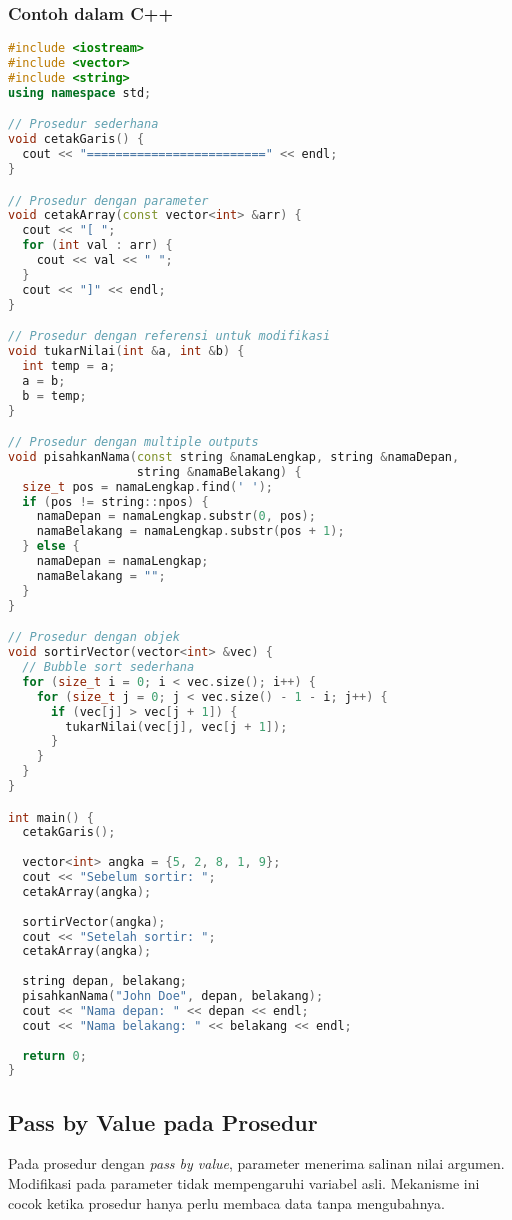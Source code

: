 \documentclass[../main.tex]{subfiles}
\begin{document}
\subsubsection{Contoh dalam C++}
\begin{lstlisting}[language=C++, caption={Definisi prosedur (C++)}]
#include <iostream>
#include <vector>
#include <string>
using namespace std;

// Prosedur sederhana
void cetakGaris() {
  cout << "=========================" << endl;
}

// Prosedur dengan parameter
void cetakArray(const vector<int> &arr) {
  cout << "[ ";
  for (int val : arr) {
    cout << val << " ";
  }
  cout << "]" << endl;
}

// Prosedur dengan referensi untuk modifikasi
void tukarNilai(int &a, int &b) {
  int temp = a;
  a = b;
  b = temp;
}

// Prosedur dengan multiple outputs
void pisahkanNama(const string &namaLengkap, string &namaDepan, 
                  string &namaBelakang) {
  size_t pos = namaLengkap.find(' ');
  if (pos != string::npos) {
    namaDepan = namaLengkap.substr(0, pos);
    namaBelakang = namaLengkap.substr(pos + 1);
  } else {
    namaDepan = namaLengkap;
    namaBelakang = "";
  }
}

// Prosedur dengan objek
void sortirVector(vector<int> &vec) {
  // Bubble sort sederhana
  for (size_t i = 0; i < vec.size(); i++) {
    for (size_t j = 0; j < vec.size() - 1 - i; j++) {
      if (vec[j] > vec[j + 1]) {
        tukarNilai(vec[j], vec[j + 1]);
      }
    }
  }
}

int main() {
  cetakGaris();
  
  vector<int> angka = {5, 2, 8, 1, 9};
  cout << "Sebelum sortir: ";
  cetakArray(angka);
  
  sortirVector(angka);
  cout << "Setelah sortir: ";
  cetakArray(angka);
  
  string depan, belakang;
  pisahkanNama("John Doe", depan, belakang);
  cout << "Nama depan: " << depan << endl;
  cout << "Nama belakang: " << belakang << endl;
  
  return 0;
}
\end{lstlisting}

\subsection{Pass by Value pada Prosedur}
Pada prosedur dengan \emph{pass by value}, parameter menerima salinan nilai argumen. Modifikasi pada parameter tidak mempengaruhi variabel asli. Mekanisme ini cocok ketika prosedur hanya perlu membaca data tanpa mengubahnya.
\end{document}
